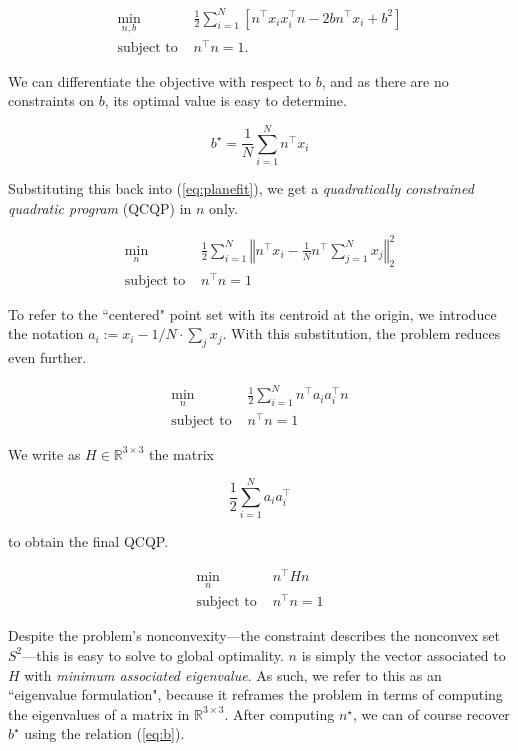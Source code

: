 \documentclass[conference]{IEEEtran}
\begin{document}
\begin{align}
	\min_{n, b} \; & \frac12 \sum_{i = 1}^N \left[ n^\top x_i x_i^\top n - 2 b n^\top x_i + b^2 \right] \\
	\text{subject to } & n^\top n = 1.
\end{align}

We can differentiate the objective with respect to \( b \), and as there are no constraints on \( b \), its optimal value is easy to determine.

\begin{equation}
	b^\star = \frac1N \sum_{i=1}^N n^\top x_i
	\label{eq:b}
\end{equation}

Substituting this back into (\ref{eq:planefit}), we get a \textit{quadratically constrained quadratic program} (QCQP) in \( n \) only.

\begin{align}
	\min_{n} \; & \frac12 \sum_{i = 1}^N \left\Vert n^\top x_i - \frac1N n^\top \sum_{j=1}^N x_j \right\Vert_2^2 \\
	\text{subject to } & n^\top n = 1
\end{align}

To refer to the ``centered" point set with its centroid at the origin, we introduce the notation \( a_i := x_i - 1/N \cdot \sum_j x_j \).  With this substitution, the problem reduces even further.

\begin{align}
	\min_{n} \; & \frac12 \sum_{i = 1}^N n^\top a_i a_i^\top n \\
	\text{subject to } & n^\top n = 1
\end{align}

We write as \( H \in \mathbb{R}^{3 \times 3} \) the matrix

\begin{equation*}
	\frac12 \sum_{i = 1}^N a_i a_i^\top
\end{equation*}

to obtain the final QCQP.

\begin{align}
	\min_{n} \; & n^\top H n \\
	\text{subject to } & n^\top n = 1
\end{align}

Despite the problem's nonconvexity---the constraint describes the nonconvex set \( S^2 \)---this is easy to solve to global optimality.  \( n \) is simply the vector associated to \( H \) with \textit{minimum associated eigenvalue}.  As such, we refer to this as an ``eigenvalue formulation", because it reframes the problem in terms of computing the eigenvalues of a matrix in \( \mathbb{R}^{3 \times 3} \).  After computing \( n^\star \), we can of course recover \( b^\star \) using the relation (\ref{eq:b}).
\end{document}
